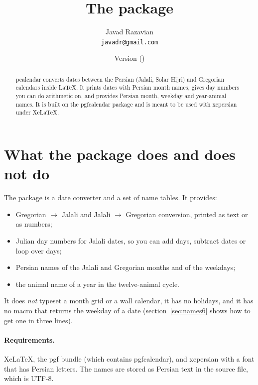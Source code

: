 \documentclass[11pt]{article}
\title{The \pkg{pcalendar} package}
\author{Javad Razavian\\\texttt{javadr@gmail.com}}
\date{Version \pcalendarversion\quad(\pcalendardate)}
\newcommand\pkg[1]{\textsf{#1}}
\begin{document}
\latin %

\maketitle

\begin{abstract}\noindent
\pkg{pcalendar} converts dates between the Persian (Jalali, Solar Hijri) and Gregorian calendars
inside \LaTeX{}. It prints dates with Persian month names, gives day numbers you can do arithmetic
on, and provides Persian month, weekday and year-animal names. It is built on the \pkg{pgfcalendar}
package and is meant to be used with \pkg{xepersian} under XeLaTeX.
\end{abstract}

\tableofcontents

\section{What the package does and does not do}\label{sec:what1}

The package is a date converter and a set of name tables. It provides:
\begin{itemize}
  \item Gregorian $\to$ Jalali and Jalali $\to$ Gregorian conversion, printed as text or as numbers;
  \item Julian day numbers for Jalali dates, so you can add days, subtract dates or loop over days;
  \item Persian names of the Jalali and Gregorian months and of the weekdays;
  \item the animal name of a year in the twelve-animal cycle.
\end{itemize}
It does \emph{not} typeset a month grid or a wall calendar, it has no holidays, and it has no macro
that returns the weekday of a date (section~\ref{sec:names6} shows how to get one in three lines).

\paragraph{Requirements.} XeLaTeX, the \pkg{pgf} bundle (which contains \pkg{pgfcalendar}), and
\pkg{xepersian} with a font that has Persian letters. The names are stored as Persian text in the
source file, which is UTF-8.
\end{document}
